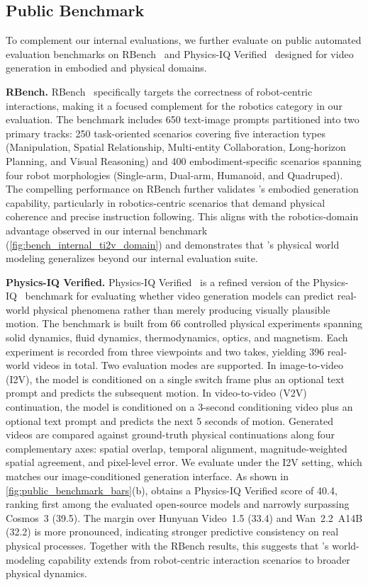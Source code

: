 \subsection{Public Benchmark}

To complement our internal evaluations, we further evaluate \method on public automated evaluation benchmarks on RBench~\cite{deng2026rethinking} and Physics-IQ Verified~\cite{radsch2026physics} designed for video generation in embodied and physical domains. 

\noindent\textbf{RBench.} RBench~\cite{deng2026rethinking} specifically targets the correctness of robot-centric interactions, making it a focused complement for the robotics category in our evaluation.
The benchmark includes 650 text-image prompts partitioned into two primary tracks: 250 task-oriented scenarios covering five interaction types (Manipulation, Spatial Relationship, Multi-entity Collaboration, Long-horizon Planning, and Visual Reasoning) and 400 embodiment-specific scenarios spanning four robot morphologies (Single-arm, Dual-arm, Humanoid, and Quadruped).
The compelling performance on RBench further validates \method's embodied generation capability, particularly in robotics-centric scenarios that demand physical coherence and precise instruction following.
This aligns with the robotics-domain advantage observed in our internal benchmark (\cref{fig:bench_internal_ti2v_domain}) and demonstrates that \method's physical world modeling generalizes beyond our internal evaluation suite.

\noindent\textbf{Physics-IQ Verified.}
Physics-IQ Verified~\cite{radsch2026physics} is a refined version of the Physics-IQ~\cite{Motamed_2026_WACV} benchmark for evaluating whether video generation models can predict real-world physical phenomena rather than merely producing visually plausible motion.
The benchmark is built from 66 controlled physical experiments spanning solid dynamics, fluid dynamics, thermodynamics, optics, and magnetism.
Each experiment is recorded from three viewpoints and two takes, yielding 396 real-world videos in total.
Two evaluation modes are supported.
In image-to-video (I2V), the model is conditioned on a single switch frame plus an optional text prompt and predicts the subsequent motion.
In video-to-video (V2V) continuation, the model is conditioned on a 3-second conditioning video plus an optional text prompt and predicts the next 5 seconds of motion.
Generated videos are compared against ground-truth physical continuations along four complementary axes: spatial overlap, temporal alignment, magnitude-weighted spatial agreement, and pixel-level error.
We evaluate \method under the I2V setting, which matches our image-conditioned generation interface.
As shown in \cref{fig:public_benchmark_bars}(b), \method obtains a Physics-IQ Verified score of 40.4, ranking first among the evaluated open-source models and narrowly surpassing Cosmos~3 (39.5).
The margin over Hunyuan Video~1.5 (33.4) and Wan~2.2~A14B (32.2) is more pronounced, indicating stronger predictive consistency on real physical processes.
Together with the RBench results, this suggests that \method's world-modeling capability extends from robot-centric interaction scenarios to broader physical dynamics.


